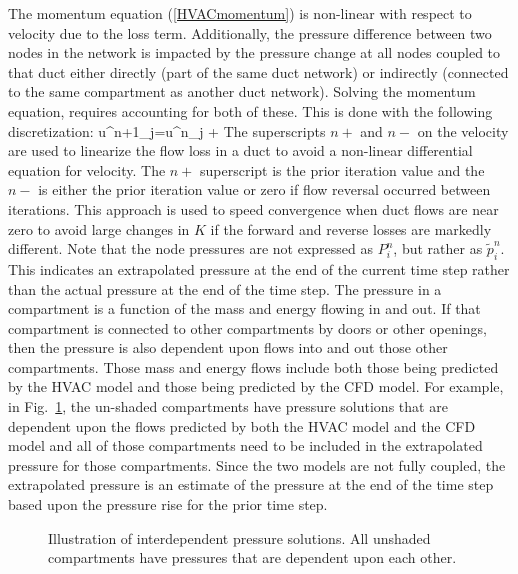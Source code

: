 The momentum equation (\ref{HVACmomentum}) is non-linear with respect to velocity due to
the loss term.  Additionally, the pressure difference between two nodes in the network is impacted by the pressure change at all
nodes coupled to that duct either directly (part of the same duct network) or indirectly (connected to the same compartment as another duct network).
Solving the momentum equation, requires accounting for both of these.  This is done with the following discretization:
\be u^{n+1}_j=u^{n}_j +   \label{HVACdiscretemomentum} \ee
The superscripts $n+$ and $n-$ on the velocity are used to linearize the flow loss in a duct to avoid a non-linear differential equation for velocity.
The $n+$ superscript is the prior iteration value and the $n-$ is either the prior iteration value or zero if flow reversal occurred between iterations.
This approach is used to speed convergence when duct flows are near zero to avoid large changes in $K$ if the forward and reverse losses are markedly different.
Note that the node pressures are not expressed as $P^n_i$, but rather as $\tilde{p}^n_i$.  This indicates an extrapolated pressure at the end of the current time step
rather than the actual pressure at the end of the time step.  The pressure in a compartment is a function of the mass and energy flowing in and out.
If that compartment is connected to other compartments by doors or other openings, then the pressure is also dependent upon flows into and out those other compartments.
Those mass and energy flows include both those being predicted by the HVAC model and those being predicted by the CFD model.
For example, in Fig.~\ref{hvacpressure}, the un-shaded compartments have pressure solutions that are dependent upon the flows predicted by both the
HVAC model and the CFD model and all of those compartments need to be included in the extrapolated pressure for those compartments.
Since the two models are not fully coupled, the extrapolated pressure is an estimate of the pressure at the end of the time step based upon the pressure rise for the prior time step.

\begin{figure}[ht!]
   \begin{center}
      \caption[Illustration of interdependent pressure solutions]{\label{hvacpressure} Illustration of interdependent pressure solutions.  All unshaded compartments have pressures that are dependent upon each other.}
   \end{center}
\end{figure}


